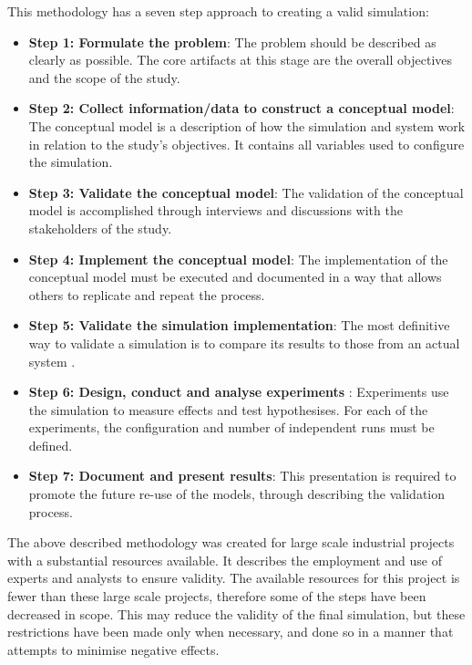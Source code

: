 This methodology has a seven step approach to creating a valid simulation:
\begin{itemize}
  \item \textbf{Step 1: Formulate the problem}: %
	The problem should be described as clearly as possible.
	The core artifacts at this stage are the overall objectives and the scope of the study.
\item \textbf{Step 2: Collect information/data to construct a conceptual model}: %
	The conceptual model is a description of how the simulation and system work in relation to the study's objectives.
	It contains all variables used to configure the simulation. 
\item \textbf{Step 3: Validate the conceptual model}: %
	The validation of the conceptual model is accomplished through interviews and discussions with the stakeholders of the study.
\item \textbf {Step 4: Implement the conceptual model}: %
	The implementation of the conceptual model must be executed and documented in a way that allows others to replicate and repeat the process.
\item \textbf{Step 5: Validate the simulation implementation}: %
	The most definitive way to validate a simulation is to compare its results to those from an actual system \citep{Law2005}.
\item \textbf{Step 6: Design, conduct and analyse experiments} :
	Experiments use the simulation to measure effects and test hypothesises. 
	For each of the experiments, the configuration and number of independent runs must be defined.
\item \textbf{Step 7: Document and present results}:
	This presentation is required to promote the future re-use of the models, through describing the validation process.
\end{itemize}

The above described methodology was created for large scale industrial projects with a substantial resources available.
It describes the employment and use of experts and analysts to ensure validity.
The available resources for this project is fewer than these large scale projects, therefore some of the steps have been decreased in scope.
This may reduce the validity of the final simulation, but these restrictions have been made only when necessary,
and done so in a manner that attempts to minimise negative effects.

